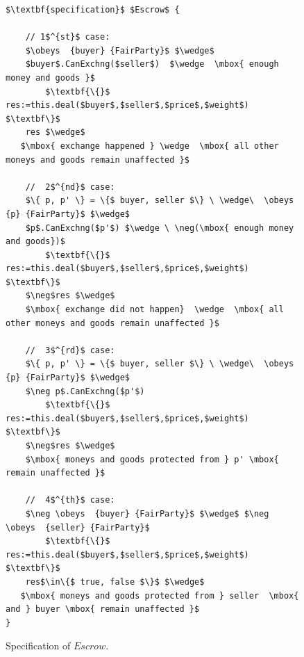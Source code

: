 %    
%     
%          
%

 \begin{figure}[t]
\begin{lstlisting}[mathescape=true, language=Chainmail, frame=lines]
$\textbf{specification}$ $Escrow$ {
    
    // 1$^{st}$ case:
    $\obeys  {buyer} {FairParty}$ $\wedge$ 
    $buyer$.CanExchng($seller$)  $\wedge  \mbox{ enough money and goods }$  
        $\textbf{\{}$ res:=this.deal($buyer$,$seller$,$price$,$weight$) $\textbf\}$
    res $\wedge$
   $\mbox{ exchange happened } \wedge  \mbox{ all other moneys and goods remain unaffected }$
   
    //  2$^{nd}$ case:
    $\{ p, p' \} = \{$ buyer, seller $\} \ \wedge\  \obeys  {p} {FairParty}$ $\wedge$ 
    $p$.CanExchng($p'$) $\wedge \ \neg(\mbox{ enough money and goods})$  
        $\textbf{\{}$ res:=this.deal($buyer$,$seller$,$price$,$weight$) $\textbf\}$
    $\neg$res $\wedge$
    $\mbox{ exchange did not happen}  \wedge  \mbox{ all other moneys and goods remain unaffected }$
    
    //  3$^{rd}$ case:
    $\{ p, p' \} = \{$ buyer, seller $\} \ \wedge\  \obeys  {p} {FairParty}$ $\wedge$ 
    $\neg p$.CanExchng($p'$) 
        $\textbf{\{}$ res:=this.deal($buyer$,$seller$,$price$,$weight$) $\textbf\}$
    $\neg$res $\wedge$
    $\mbox{ moneys and goods protected from } p' \mbox{ remain unaffected }$   
    
    //  4$^{th}$ case:
    $\neg \obeys  {buyer} {FairParty}$ $\wedge$ $\neg \obeys  {seller} {FairParty}$ 
        $\textbf{\{}$ res:=this.deal($buyer$,$seller$,$price$,$weight$) $\textbf\}$
    res$\in\{$ true, false $\}$ $\wedge$
   $\mbox{ moneys and goods protected from } seller  \mbox{ and } buyer \mbox{ remain unaffected }$   
}

\end{lstlisting}
\caption{Specification of  $Escrow$. }
\label{fig:EscrowSpec}
 \end{figure}
 
